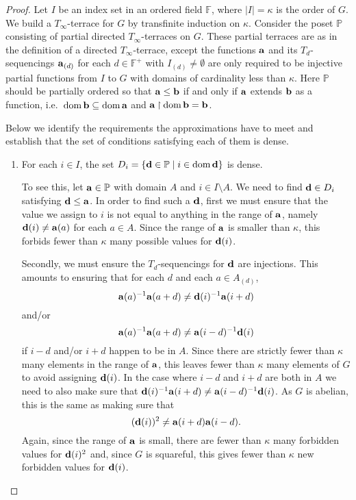 \documentclass[12pt,a4paper]{article}
\newcommand{\F}{\mathbb{F}}
\DeclareMathOperator{\dom}{dom}
\newcommand{\rest}{\mathbin{\upharpoonright}}
\newcommand{\st}{\; | \;}
\newcommand{\set}[2]{\left\{#1\st #2 \right\}}
\renewcommand{\P}{\mathbb{P}}
\renewcommand{\a}{\textup{\textbf{a}}}
\renewcommand{\b}{\textup{\textbf{b}}}
\renewcommand{\d}{\textup{\textbf{d}}}
\begin{document}
\begin{proof}
Let $I$ be an index set in an ordered field $\F$, where $|I|=\kappa$ is the order of $G$. We build a $T_\infty$-terrace for $G$ by transfinite induction on $\kappa$. Consider the poset $\P$ consisting of partial directed $T_\infty$-terraces on $G$. These partial terraces are as in the definition of a directed $T_\infty$-terrace, except the functions $\a$ and its $T_d$-sequencings $\a_{(d)}$ for each $d \in \F^+$ with $I_{(d)} \neq \emptyset$ are only required to be injective partial functions from $I$ to $G$ with domains of cardinality less than $\kappa$. Here $\P$ should be partially ordered so that $\a \leq \b$ if and only if $\a$ extends $\b$ as a function, i.e.\ $\dom \b \subseteq \dom \a$ and $\a \rest \dom \b = \b$.

Below we identify the requirements the approximations have to meet and establish that the set of conditions satisfying each of them is dense.

\begin{enumerate}
	\item \label{item:DomainDense} For each $i \in I$, the set $D_i=\set{\d \in \P}{i \in \dom \d }$ is dense. 
	
	To see this, let $\a \in \P$ with domain $A$ and $i \in I \setminus A$. We need to find $\d \in D_i$ satisfying $\d \leq \a$. In order to find such a $\d$, first we must ensure that the value we assign to $i$ is not equal to anything in the range of $\a$, namely $\d(i) \neq \a(a)$ for each $a \in A$.
	Since the range of \(\a\) is smaller than \(\kappa\), this forbids fewer than \(\kappa\) many possible values for \(\d(i)\).
	
	Secondly, we must ensure the $T_d$-sequencings for $\d$ are injections. This amounts to ensuring that for each \(d\) and each $a \in A_{(d)}$, 
		$$\a(a)^{-1}\a(a+d) \neq \d(i)^{-1}\a(i+d)$$ and/or
		$$\a(a)^{-1}\a(a+d) \neq \a(i-d)^{-1}\d(i)$$ if $i-d$ and/or $i+d$ happen to be in $A$. Since there are strictly fewer than $\kappa$ many elements in the range of $\a$, this leaves fewer than $\kappa$ many elements of $G$ to avoid assigning $\d(i)$.
	In the case where $i-d$ and $i+d$ are both in $A$ we need to also make sure that $\d(i)^{-1}\a(i+d) \neq \a(i-d)^{-1}\d(i)$. As $G$ is abelian, this is the same as making sure that $$(\d(i))^2 \neq \a(i+d)\a(i-d).$$
	Again, since the range of $\a$ is small, there are fewer than $\kappa$ many forbidden
	values for $\d(i)^2$ and, since $G$ is squareful, this gives fewer than $\kappa$ new
	forbidden values for $\d(i)$.
	

\end{enumerate}
\end{proof}
\end{document}
